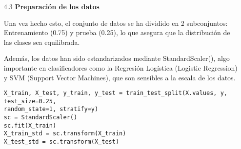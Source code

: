 \documentclass{article}
\begin{document}
\begin{itemize}

\item[4.3]  {\bf Preparaci\'on de los datos}

Una vez hecho esto, el conjunto de datos se ha dividido en 2 subconjuntos: Entrenamiento (0.75) y prueba (0.25), lo que asegura que la distribuci\'on de las clases sea equilibrada.

Adem\'as, los datos han sido estandarizados mediante StandardScaler(), algo importante en clasificadores como la Regresi\'on Log\'istica (Logistic Regression) y SVM (Support Vector Machines), que son sensibles a la escala de los datos.

\begin{tcolorbox}[width=14cm]
\begin{scriptsize}
\begin{verbatim}
X_train, X_test, y_train, y_test = train_test_split(X.values, y, test_size=0.25,
random_state=1, stratify=y)
sc = StandardScaler()
sc.fit(X_train)
X_train_std = sc.transform(X_train)
X_test_std = sc.transform(X_test)
\end{verbatim}
\end{scriptsize}
\end{tcolorbox}

\end{itemize}

\newpage
\end{document}
